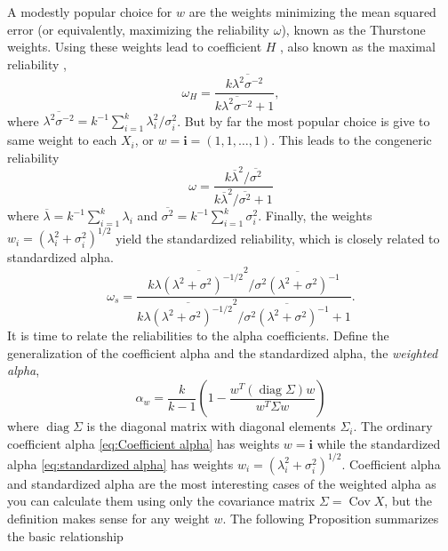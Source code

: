 \documentclass[twoside]{article}
\DeclareMathOperator{\Cov}{Cov}
\DeclareMathOperator{\diag}{diag}
\renewcommand{\sqrt}[1]{{(#1)^{1/2}}}
\begin{document}
A modestly popular choice for $w$ are the weights minimizing the mean squared error (or equivalently, maximizing the reliability $\omega$), known as the Thurstone \citep{thurshronebook} weights. Using these weights lead to coefficient $H$ \citep{hancock2001rethinking}, also known as the maximal reliability \citep{Li1997-yh}, 
\begin{equation}
\label{eq:coefficient_H}
\omega_{H}=\frac{k\overline{\lambda^{2}\sigma^{-2}}}{k\overline{\lambda^{2}\sigma^{-2}}+1},
\end{equation}
where $\overline{\lambda^{2}\sigma^{-2}} = k^{-1}\sum_{i=1}^{k}\lambda_{i}^2/\sigma_i^2$. But by far the most popular choice is give to same weight to each $X_i$, or $w = \mathbf{i}=\left(1,1,\ldots,1\right)$. This leads to the congeneric reliability
\begin{equation}
\omega =\frac{k\overline{\lambda}^{2}/\overline{\sigma^{2}}}{k\overline{\lambda}^{2}/\overline{\sigma^{2}} + 1}\label{eq:Congeneric reliability}
\end{equation}
where $\overline{\lambda}=k^{-1}\sum_{i=1}^{k}\lambda_{i}$ and
$\overline{\sigma^{2}}=k^{-1}\sum_{i=1}^{k}\sigma_{i}^{2}$. Finally, the weights $w_i = \sqrt{\lambda_i^2 + \sigma_i^2}$ yield the standardized reliability, which is closely related to standardized alpha.
\begin{equation}
\omega_s=\frac{k\overline{\lambda(\lambda^{2}+\sigma^{2})^{-1/2}}^{2}/\overline{\sigma^{2}(\lambda^{2}+\sigma^{2})^{-1}}}{k\overline{\lambda(\lambda^{2}+\sigma^{2})^{-1/2}}^{2}/\overline{\sigma^{2}(\lambda^{2}+\sigma^{2})^{-1}}+1}.\label{eq:Standardized reliability}
\end{equation}
It is time to relate the reliabilities to the alpha coefficients.
Define the generalization of the coefficient alpha and the standardized
alpha, the \emph{weighted alpha},
\begin{equation}
\alpha_{w}=\frac{k}{k-1}\left(1-\frac{w^{T}(\diag\Sigma)w}{w^{T}\Sigma w}\right)\label{eq:weighted alpha}
\end{equation}
where $\diag\Sigma$ is the diagonal matrix with diagonal elements $\Sigma_i$.
The ordinary coefficient alpha \eqref{eq:Coefficient alpha} has weights $w=\mathbf{i}$
while the standardized alpha \eqref{eq:standardized alpha} has weights $w_{i}=\sqrt{\lambda_{i}^{2}+\sigma_{i}^{2}}$. Coefficient alpha and standardized alpha are the most interesting cases of the weighted alpha as you can calculate them using only the covariance matrix $\Sigma = \Cov X$, but the definition makes sense for any weight $w$. The following Proposition summarizes the basic relationship
\end{document}
